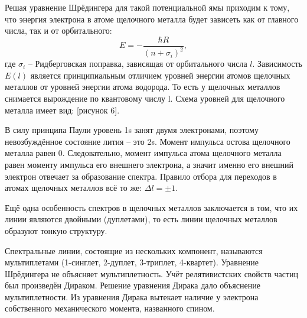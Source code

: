 Решая уравнение Шрёдингера для такой потенциальной ямы приходим к тому, что
энергия электрона в атоме щелочного металла будет зависеть как от главного
числа, так и от орбитального:
\[
    E = -\frac{\hbar R}{(n + \sigma_i)^2},
\]
где \(\sigma_i\) -- Ридберговская поправка, зависящая от орбитального числа
\( l \). Зависимость \( E(l) \) является принципиальным отличием уровней энергии
атомов щелочных металлов от уровней энергии атома водорода. То есть у щелочных
металлов снимается вырождение по квантовому числу l. Схема уровней для щелочного
металла имеет вид: [рисунок 6].

В силу принципа Паули уровень 1s занят двумя электронами, поэтому невозбуждённое
состояние лития -- это 2s. Момент импульса остова щелочного металла равен 0.
Следовательно, момент импульса атома щелочного металла равен моменту импульса
его внешнего электрона, а значит именно его внешний электрон отвечает за
образование спектра. Правило отбора для переходов в атомах щелочных металлов
всё то же: \( \Delta l = \pm1 \).

Ещё одна особенность спектров в щелочных металлов заключается в том, что их
линии являются двойными (дуплетами), то есть линии щелочных металлов образуют
тонкую структуру.

Спектральные линии, состоящие из нескольких компонент, называются мультиплетами
(1-синглет, 2-дуплет, 3-триплет, 4-квартет). Уравнение Шрёдингера не объясняет
мультиплетность. Учёт релятивистских свойств частиц был произведён Дираком.
Решение уравнения Дирака дало объяснение мультиплетности. Из уравнения Дирака
вытекает наличие у электрона собственного механического момента, названного
спином.